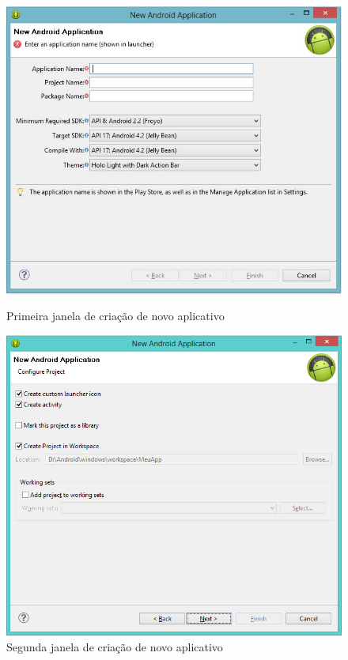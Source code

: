 \documentclass[a4paper,12pt,brazil]{book}
\begin{document}
\begin{figure}[H]
  \centering
  \includegraphics[width=.8\textwidth]{figuras/1-criando-app.jpg}
  \caption{Primeira janela de criação de novo aplicativo}
  \label{fig:d}
  \includegraphics[width=.8\textwidth]{figuras/2-criando-app-2.png}
  \caption{Segunda janela de criação de novo aplicativo}
  \label{fig:c}
\end{figure}
\newpage
\end{document}
